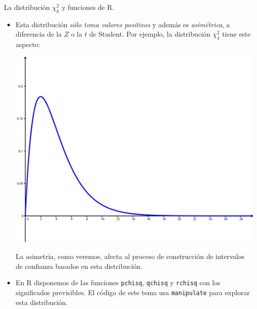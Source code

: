 \documentclass[
  9pt,
  ignorenonframetext,
]{beamer}
\begin{document}
\begin{frame}[fragile]{La distribución \(\chi^2_k\) y funciones de R.}
\protect\hypertarget{la-distribucion-chi2_k-y-funciones-de-r.}{}

\begin{itemize}
\item
  Esta distribución \emph{sólo toma valores positivos} y además es
  \emph{asimétrica}, a diferencia de la \(Z\) o la \(t\) de Student. Por
  ejemplo, la distribución \(\chi^2_4\) tiene este aspecto:

  \begin{center}\includegraphics[width=0.5\linewidth]{../fig/06-06-DensidadChiCuadrado} \end{center}

  La asimetría, como veremos, afecta al proceso de construcción de
  intervalos de confianza basados en esta distribución.
\item
  En R disponemos de las funciones \texttt{pchisq}, \texttt{qchisq} y
  \texttt{rchisq} con los significados previsibles. El código de este
  tema usa \texttt{manipulate} para explorar esta distribución.
\end{itemize}

\end{frame}
\end{document}
